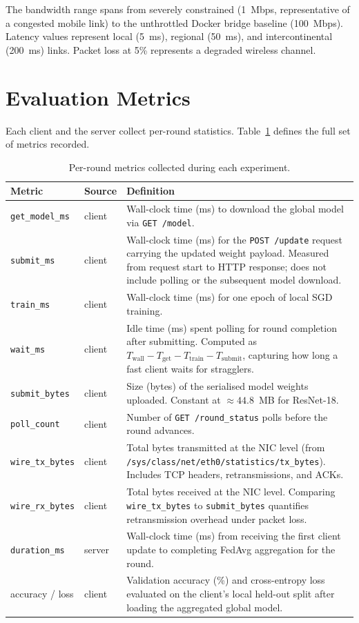\documentclass[12pt,a4paper]{report}
\begin{document}
The bandwidth range spans from severely constrained (1~Mbps, representative of a
congested mobile link) to the unthrottled Docker bridge baseline (100~Mbps).
Latency values represent local (5~ms), regional (50~ms), and intercontinental
(200~ms) links.  Packet loss at 5\% represents a degraded wireless channel.

\section{Evaluation Metrics}

Each client and the server collect per-round statistics.
Table~\ref{tab:metrics} defines the full set of metrics recorded.

\begin{table}[H]
\centering
\caption{Per-round metrics collected during each experiment.}
\label{tab:metrics}
\begin{tabular}{llp{7.5cm}}
\toprule
Metric & Source & Definition \\
\midrule
\texttt{get\_model\_ms} & client &
  Wall-clock time (ms) to download the global model via \texttt{GET /model}. \\
\texttt{submit\_ms} & client &
  Wall-clock time (ms) for the \texttt{POST /update} request carrying the
  updated weight payload. Measured from request start to HTTP response; does
  not include polling or the subsequent model download. \\
\texttt{train\_ms} & client &
  Wall-clock time (ms) for one epoch of local SGD training. \\
\texttt{wait\_ms} & client &
  Idle time (ms) spent polling for round completion after submitting.
  Computed as $T_{\mathrm{wall}} - T_{\mathrm{get}} - T_{\mathrm{train}} -
  T_{\mathrm{submit}}$, capturing how long a fast client waits for stragglers. \\
\texttt{submit\_bytes} & client &
  Size (bytes) of the serialised model weights uploaded.  Constant at
  $\approx 44.8$~MB for ResNet-18. \\
\texttt{poll\_count} & client &
  Number of \texttt{GET /round\_status} polls before the round advances. \\
\texttt{wire\_tx\_bytes} & client &
  Total bytes transmitted at the NIC level (from \texttt{/sys/class/net/eth0/statistics/tx\_bytes}).
  Includes TCP headers, retransmissions, and ACKs. \\
\texttt{wire\_rx\_bytes} & client &
  Total bytes received at the NIC level.  Comparing
  \texttt{wire\_tx\_bytes} to \texttt{submit\_bytes} quantifies
  retransmission overhead under packet loss. \\
\texttt{duration\_ms} & server &
  Wall-clock time (ms) from receiving the first client update to completing
  FedAvg aggregation for the round. \\
accuracy / loss & client &
  Validation accuracy (\%) and cross-entropy loss evaluated on the client's
  local held-out split after loading the aggregated global model. \\
\bottomrule
\end{tabular}
\end{table}
\end{document}
